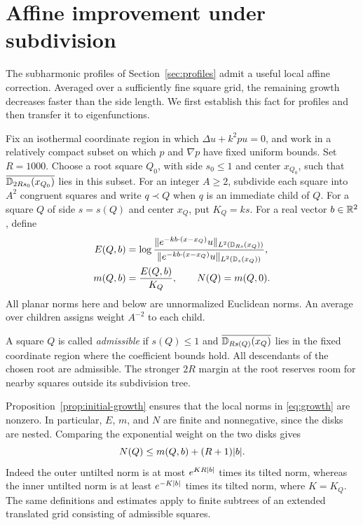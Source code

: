 \section{Affine improvement under subdivision}
\label{sec:subdivision}

The subharmonic profiles of Section~\ref{sec:profiles} admit a useful
local affine correction.  Averaged over a sufficiently fine square
grid, the remaining growth decreases faster than the side length.
We first establish this fact for profiles and then transfer it to
eigenfunctions.

\begin{samepage}
\begin{definition}
\label{def:growth}
Fix an isothermal coordinate region in which
\(\Delta u+k^2p u=0\), and work in a relatively compact subset on which
\(p\) and \(\nabla p\) have fixed uniform bounds.  Set \(R=1000\).
Choose a root square \(Q_0\), with side \(s_0\le1\) and center
\(x_{Q_0}\), such that
\(\overline{\mathbb D_{2Rs_0}(x_{Q_0})}\) lies in this subset.
For an integer \(A\ge2\), subdivide each square into \(A^2\) congruent
squares and write \(q\prec Q\) when \(q\) is an immediate child of
\(Q\).  For a square \(Q\) of side \(s=s(Q)\) and center \(x_Q\), put
\(K_Q=ks\).  For a real vector \(b\in\mathbb R^2\), define
\begin{equation}
\begin{aligned}
 E(Q,b)
 &=\log
 \frac{\lVert e^{-kb\cdot(x-x_Q)}u\rVert_{L^2(\mathbb D_{Rs}(x_Q))}}
      {\lVert e^{-kb\cdot(x-x_Q)}u\rVert_{L^2(\mathbb D_s(x_Q))}},\\
 m(Q,b)&=\frac{E(Q,b)}{K_Q},
 \qquad N(Q)=m(Q,0).
\end{aligned}
\label{eq:growth}
\end{equation}
All planar norms here and below are unnormalized Euclidean norms.
An average over children assigns weight \(A^{-2}\) to each child.
\end{definition}
\end{samepage}

A square \(Q\) is called \emph{admissible} if \(s(Q)\le1\) and
\(\overline{\mathbb D_{Rs(Q)}(x_Q)}\) lies in the fixed coordinate region
where the coefficient bounds hold.  All descendants of the chosen root
are admissible.  The stronger \(2R\) margin at the root reserves room
for nearby squares outside its subdivision tree.

Proposition~\ref{prop:initial-growth} ensures that the local norms in
\eqref{eq:growth} are nonzero.  In particular, \(E\), \(m\), and \(N\)
are finite and nonnegative, since the disks are nested.  Comparing the
exponential weight on the two disks gives
\begin{equation}
 N(Q)\le m(Q,b)+(R+1)\lvert b\rvert.
\label{eq:untilted-comparison}
\end{equation}
Indeed the outer untilted norm is at most \(e^{KR\lvert b\rvert}\) times its
tilted norm, whereas the inner untilted norm is at least
\(e^{-K\lvert b\rvert}\) times its tilted norm, where \(K=K_Q\).
The same definitions and estimates apply to finite subtrees of an
extended translated grid consisting of admissible squares.

